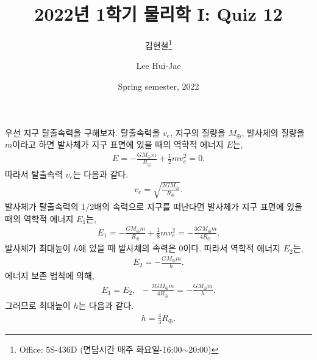 \documentclass[floatfix,nofootinbib,superscriptaddress,fleqn]{revtex4-2}
\begin{document}
\title{\Large 2022년 1학기 물리학 I: Quiz 12}
\author{김현철\footnote{Office: 5S-436D (면담시간 매주
    화요일-16:00$\sim$20:00)}} 
\author{Lee Hui-Jae} 
\date{Spring semester, 2022}

\vspace{1.cm}

\maketitle





우선 지구 탈출속력을 구해보자. 탈출속력을 $v_e$, 지구의 질량을 $M_\oplus$, 
발사체의 질량을 $m$이라고 하면 발사체가 지구 표면에 있을 때의 역학적 에너지 $E$는,
\begin{align}
    E = -\frac{GM_\oplus m}{R_\oplus} + \frac{1}{2}mv^2_e=0.
\end{align}
따라서 탈출속력 $v_e$는 다음과 같다.
\begin{align}
    v_e = \sqrt{\frac{2GM_\oplus}{R_\oplus}}.
\end{align}
발사체가 탈출속력의 1/2배의 속력으로 지구를 떠난다면 발사체가 지구 표면에 있을 때의 
역학적 에너지 $E_1$는,
\begin{align}
    E_1 = -\frac{GM_\oplus m}{R_\oplus} + \frac{1}{8}mv_e^2
    =-\frac{3GM_\oplus m}{4R_\oplus}.
\end{align}
발사체가 최대높이 $h$에 있을 때 발사체의 속력은 0이다. 따라서 역학적 에너지 $E_2$는,
\begin{align}
    E_2 = -\frac{GM_\oplus m}{h}.
\end{align}
에너지 보존 법칙에 의해,
\begin{align}
    E_1 =E_2,\,\,\,
    -\frac{3GM_\oplus m}{4R_\oplus}=-\frac{GM_\oplus m}{h}.
\end{align}
그러므로 최대높이 $h$는 다음과 같다.
\begin{align}
    h = \frac{4}{3}R_\oplus.
\end{align}
\vspace{1.cm}

\end{document}

